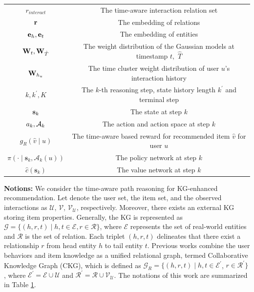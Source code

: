 \begin{table}[t!]
\begin{tabular}{cc}
$r_{interact}$                  & The time-aware interaction relation set \\
$\textbf{r}$                       & The embedding of relations            \\
$\textbf{e}_h, \textbf{e}_t$          & The embedding of entities                \\
$\textbf{W}_{t},  \textbf{W}_{\hat{T}}$   & The weight distribution of the Gaussian models at timestamp $t$,\ $\hat{T}$ \\
$\textbf{W}_{h_u}$                 & The time cluster weight distribution of user $u$'s interaction history \\
$k, k^{\prime}, K$                  & The $k$-th reasoning step, state history length $k^{\prime}$ and terminal step \\
$\textbf{s}_k$                     & The state at step $k$ \\
$a_k, \mathcal{A}_k$                     & The action and action space at step $k$ \\
$g_R(\hat{v} \mid u)$           &  The time-aware based reward for recommended item $\hat{v}$ for user $u$ \\
$\pi\left(\cdot \mid \mathbf{s}_k, \mathcal{A}_{k}(u)\right)$ & The policy network at step $k$ \\
$\hat{c}(\mathbf{s}_k)$         & The value network at step $k$ \\ \bottomrule
\end{tabular}
\label{notation_table}
\end{table}


\noindent\textbf{Notions:} 
We consider the time-aware path reasoning for KG-enhanced recommendation.
Let denote the user set, the item set, and the observed interactions as $\mathcal{U}$, $\mathcal{V}$, ${\mathcal{V}}_{\mathcal{U}}$, respectively.
Moreover, there exists an external KG storing item properties. Generally, the KG is represented as $\mathcal{G}=\{(h, r, t)  \mid h, t \in \mathcal{E}, r \in \mathcal{R}\}$, where $\mathcal{E}$ represents the set of real-world entities and $\mathcal{R}$ is the set of relation.  
Each triplet $(h,r,t)$ delineates that there exist a relationship $r$ from head entity $h$ to tail entity $t$.
Previous works \cite{multi_modal,kgat} combine the user behaviors and item knowledge as a unified relational graph, termed Collaborative Knowledge Graph (CKG), which is defined as 
$\mathcal{G}_R=\{(h, r, t) \mid h, t \in \mathcal{E}^{\prime}$, $ r \in \mathcal{R}^{\prime}\}$,  where $ \mathcal{E}^{\prime}=\mathcal{E} \cup \mathcal{U}$ and $ \mathcal{R}^{\prime}=\mathcal{R} \cup{\mathcal{V}}_{\mathcal{U}}$. The notations of this work are summarized in Table \ref{notation_table}.
	 

